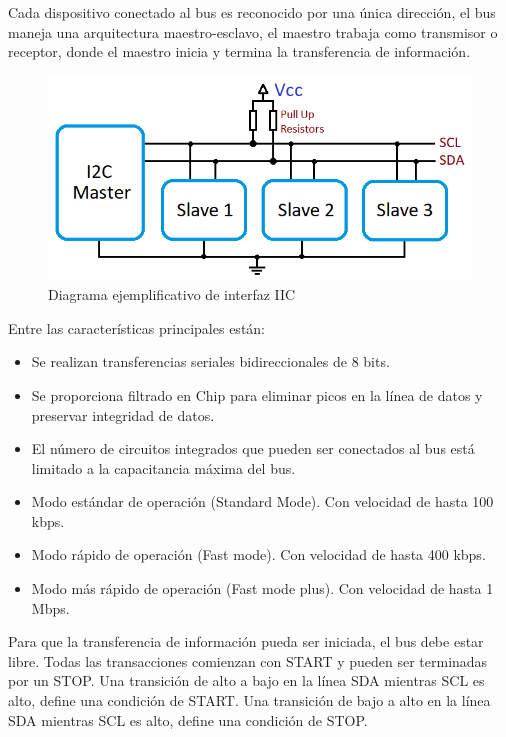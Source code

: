 Cada dispositivo conectado al bus es reconocido por una única dirección, el bus maneja una arquitectura maestro-esclavo, el maestro trabaja como transmisor o receptor, donde el maestro inicia y termina la transferencia de información.

\begin{figure}[H]
	\centering
	\includegraphics[scale=.35]{Capitulo2/images/I2C-Interface.png}
	\caption{Diagrama ejemplificativo de interfaz IIC}
	\label{fig:}
\end{figure}

Entre las características principales están:
\begin{itemize}
	\item Se realizan transferencias seriales bidireccionales de 8 bits.
    \item Se proporciona filtrado en Chip para eliminar picos en la línea de datos y preservar integridad de datos.
    \item El número de circuitos integrados que pueden ser conectados al bus está limitado a la capacitancia máxima del bus.
    \item Modo estándar de operación (Standard Mode). Con velocidad de hasta 100 kbps.
    \item Modo rápido de operación  (Fast mode). Con velocidad de hasta 400 kbps. \item Modo más rápido de operación (Fast mode plus). Con velocidad de hasta 1 Mbps.
\end{itemize}

Para que la transferencia de información pueda ser iniciada, el bus debe estar libre. Todas las transacciones comienzan con START y pueden ser terminadas por un STOP.
Una transición de alto a bajo en la línea SDA mientras SCL es alto, define una condición de START.
Una transición de bajo a alto en la línea SDA mientras SCL es alto, define una condición de STOP.

